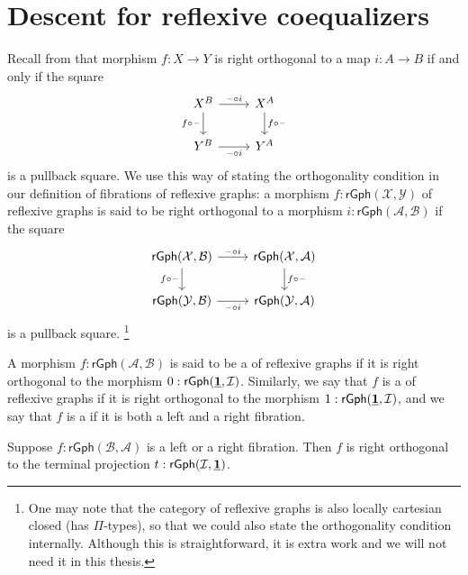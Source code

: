 \section{Descent for reflexive coequalizers}\label{sec:descent_rcoeq}

Recall from \cite{AnelBiedermanFinsterJoyal} that morphism $f:X\to Y$ is right orthogonal to a map $i:A\to B$ if and only if the square
\begin{equation*}
\begin{tikzcd}
X^B \arrow[r,"\blank\circ i"] \arrow[d,swap,"f\circ \blank"] & X^A \arrow[d,"f\circ \blank"] \\
Y^B \arrow[r,swap,"\blank\circ i"] & Y^A
\end{tikzcd}
\end{equation*}
is a pullback square. We use this way of stating the orthogonality condition in our definition of fibrations of reflexive graphs: a morphism $f:\mathsf{rGph}(\mathcal{X},\mathcal{Y})$ of reflexive graphs is said to be right orthogonal to a morphism $i:\mathsf{rGph}(\mathcal{A},\mathcal{B})$ if the square
\begin{equation*}
\begin{tikzcd}
\mathsf{rGph}(\mathcal{X},\mathcal{B}) \arrow[r,"\blank\circ i"] \arrow[d,swap,"f\circ\blank"] & \mathsf{rGph}(\mathcal{X},\mathcal{A}) \arrow[d,"f\circ\blank"] \\
\mathsf{rGph}(\mathcal{Y},\mathcal{B}) \arrow[r,swap,"\blank\circ i"] & \mathsf{rGph}(\mathcal{Y},\mathcal{A})
\end{tikzcd}
\end{equation*}
is a pullback square.%
\footnote{One may note that the category of reflexive graphs is also locally cartesian closed (has $\Pi$-types), so that we could also state the orthogonality condition internally. Although this is straightforward, it is extra work and we will not need it in this thesis.}

\begin{defn}\label{defn:graph_fibration}
A morphism $f:\mathsf{rGph}(\mathcal{A},\mathcal{B})$ is said to be a  of reflexive graphs if it is right orthogonal to the morphism $0:\mathsf{rGph}(\underline{\mathbf{1}},\mathcal{I})$. Similarly, we say that $f$ is a  of reflexive graphs if it is right orthogonal to the morphism $1:\mathsf{rGph}(\underline{\mathbf{1}},\mathcal{I})$, and we say that $f$ is a  if it is both a left and a right fibration.
\end{defn}

\begin{lem}\label{lem:leftfib_Inull}
Suppose $f:\mathsf{rGph}(\mathcal{B},\mathcal{A})$ is a left or a right fibration. Then $f$ is right orthogonal to the terminal projection $t:\mathsf{rGph}(\mathcal{I},\underline{\mathbf{1}})$.
\end{lem}

